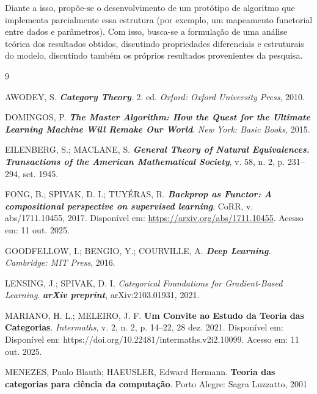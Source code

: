 \documentclass[12pt,a4paper]{article}
\begin{document}
Diante a isso, propõe-se o desenvolvimento de um protótipo de algoritmo que implementa parcialmente essa estrutura (por exemplo, um mapeamento functorial entre dados e parâmetros). Com isso, busca-se a formulação de uma análise teórica dos resultados obtidos, discutindo propriedades diferenciais e estruturais do modelo, discutindo também os próprios resultados provenientes da pesquisa.

\newpage


\begin{thebibliography}{9}

AWODEY, S. \textit{\textbf{Category Theory}}. 2. ed. \textit{Oxford: Oxford University Press}, 2010.

DOMINGOS, P. \textit{\textbf{The Master Algorithm: How the Quest for the Ultimate Learning Machine Will Remake Our World}}. \textit{New York: Basic Books}, 2015.

EILENBERG, S.; MACLANE, S. \textit{\textbf{General Theory of Natural Equivalences. Transactions of the American Mathematical Society}}, v. 58, n. 2, p. 231–294, set. 1945.

FONG, B.; SPIVAK, D. I.; TUYÉRAS, R. \textit{\textbf{Backprop as Functor: A compositional perspective on supervised learning}}. CoRR, v. abs/1711.10455, 2017. Disponível em: \url{https://arxiv.org/abs/1711.10455}. Acesso em: 11 out. 2025.

GOODFELLOW, I.; BENGIO, Y.; COURVILLE, A. \textit{\textbf{Deep Learning}. Cambridge: MIT Press}, 2016.

LENSING, J.; SPIVAK, D. I. \textit{Categorical Foundations for Gradient-Based Learning}. \textit{\textbf{arXiv preprint}}, arXiv:2103.01931, 2021.

MARIANO, H. L.; MELEIRO, J. F. \textbf{Um Convite ao Estudo da Teoria das Categorias}. \textit{Intermaths}, v. 2, n. 2, p. 14–22, 28 dez. 2021. Disponível em: Disponível em: https://doi.org/10.22481/intermaths.v2i2.10099. Acesso em: 11 out. 2025.

MENEZES, Paulo Blauth; HAEUSLER, Edward Hermann. \textbf{Teoria das categorias para ciência da computação}. Porto Alegre: Sagra Luzzatto, 2001

\end{thebibliography}
\end{document}
